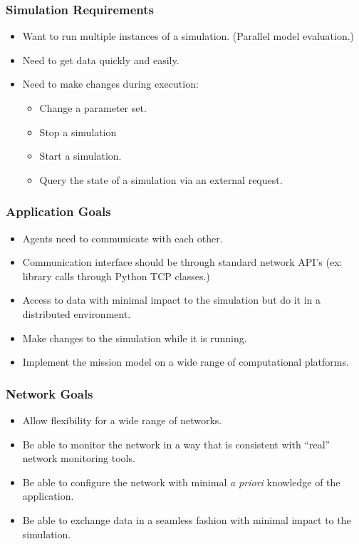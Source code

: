 \documentclass{beamer}
\begin{document}
\begin{frame}
  \frametitle{Simulation Requirements}

  \begin{itemize}
  \item Want to run multiple instances of a simulation. (Parallel
    model evaluation.)
  \item Need to get data quickly and easily.
  \item Need to make changes during execution:
    \begin{itemize}
    \item Change a parameter set.
    \item Stop a simulation
    \item Start a simulation.
    \item Query the state of a simulation via an external request.
    \end{itemize}
  \end{itemize}

\end{frame}


\begin{frame}
  \frametitle{Application Goals}

  \begin{itemize}
  \item Agents need to communicate with each other.
  \item Communication interface should be through standard network
    API's (ex: library calls through Python TCP classes.)
  \item Access to data with minimal impact to the simulation but do it
    in a distributed environment.
  \item Make changes to the simulation while it is running.
  \item Implement the mission model on a wide range of computational
    platforms.
  \end{itemize}


\end{frame}

\begin{frame}
  \frametitle{Network Goals}

  \begin{itemize}
  \item Allow flexibility for a wide range of networks.
  \item Be able to monitor the network in a way that is consistent
    with ``real'' network monitoring tools.
  \item Be able to configure the network with minimal \textit{a
      priori} knowledge of the application.
  \item Be able to exchange data in a seamless fashion with minimal
    impact to the simulation.
  \end{itemize}

\end{frame}
\end{document}
